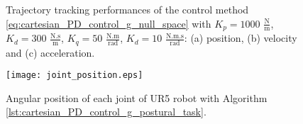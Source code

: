 \vspace*{0cm}
\begin{figure}[H]
	\centering
	\caption{Trajectory tracking performances of the control method \eqref{eq:cartesian_PD_control_g_null_space} with  ${K_{p}}=1000$ $\mathrm{\frac{N}{m}}$, $K_{d}= 300$ $\mathrm{\frac{N.s}{m}}$, ${K_{q}}=50$ $\mathrm{\frac{N.m}{rad}}$, $K_{d}= 10$ $\mathrm{\frac{N.m.s}{rad}}$: (a) position, (b) velocity and (c) acceleration.}
	\label{fig:act_1.6_ee_position}
\end{figure}

\begin{figure}
    \centering
    \texttt{[image: joint\_position.eps]}	
    \caption{Angular position of each joint of UR5 robot with Algorithm \ref{lst:cartesian_PD_control_g_postural_task}.}
    \label{fig:act_1.6_joint_position}
\end{figure}